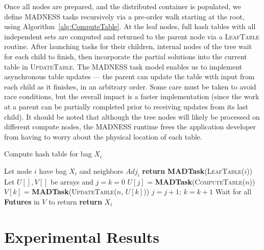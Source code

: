 \documentclass[conference]{IEEEtran}
\begin{document}
Once all nodes are prepared, and the distributed container is populated, we
define MADNESS tasks recursively via a pre-order walk starting at the root,
using Algorithm~\ref{alg:ComputeTable}.
At the leaf nodes, full hash tables with all independent sets are computed and returned
to the parent node via a \textsc{LeafTable} routine. After launching tasks for their children,
internal nodes of the tree wait for each child to finish, then incorporate the partial solutions
into the current table in \textsc{UpdateTable}. %
The MADNESS task model enables us to
implement asynchronous table updates --- the parent can update the table with
input from each child as it finishes, in an arbitrary order. Some care
must be taken to avoid race conditions, but the overall impact is
a faster implementation (since the work at a parent can be partially
completed prior to receiving updates from its last child). It should be noted that
although the tree nodes will likely be processed on different compute nodes,
the MADNESS runtime frees the application developer from having to
worry about the physical location of each table.

\begin{algorithm}[ht!]
\caption{Compute hash table for bag $X_{i}$}\label{alg:ComputeTable}
\begin{algorithmic}[1]
\State Let node $i$ have bag $X_i$ and neighbors $Adj_i$
\State \textbf{return} \textbf{MADTask}(\textsc{LeafTable}($i$))
\EndIf
\State Let $U[], V[]$ be arrays and $j = k = 0$
\State $U[j]$ = \textbf{MADTask}(\textsc{ComputeTable}($n$))
\State $V[k]$ = \textbf{MADTask}(\textsc{UpdateTable}($n$, $U[k]$))
\State $j = j + 1$; $k = k + 1$
\EndFor
\State Wait for all \textbf{Futures} in $V$ to return
\State \textbf{return} $X_{i}$
\EndProcedure
\end{algorithmic}
\end{algorithm}

\section{Experimental Results}~\label{sec:experiments}
\end{document}
